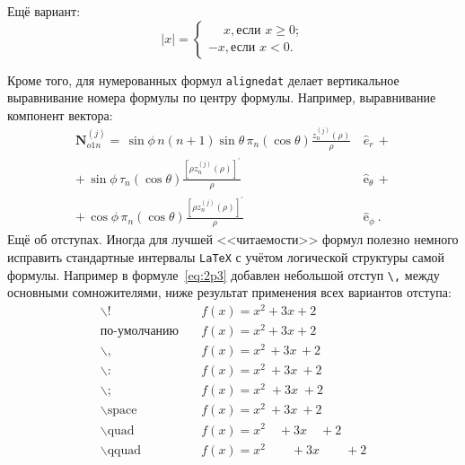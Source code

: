 \documentclass[12pt]{extarticle}
\begin{document}
Ещё вариант:
\[|x|=
    \begin{cases}
        \phantom{-}x, \text{если } x \geqslant 0; \\
        -x, \text{если } x<0.
    \end{cases}\]

Кроме того, для нумерованных формул \texttt{alignedat} делает вертикальное
выравнивание номера формулы по центру формулы.
Например, выравнивание компонент вектора:
\begin{equation}
\label{eq:2p3}
    \begin{alignedat}{2}
        {\mathbf{N}}_{o1n}^{(j)} = \,{\sin} \phi\,n\!\left(n+1\right)
        {\sin}\theta\,
        \pi_n\!\left({\cos} \theta\right)
        \frac{
        z_n^{(j)}\!\left( \rho \right)
        }{\rho}\,
         & {\hat{ e}}_{r}\,+      \\
        +\,
        {\sin} \phi\,
        \tau_n\!\left({\cos} \theta\right)
        \frac{
        \left[\rho z_n^{(j)}\!\left( \rho \right)\right]^{\prime}
        }{\rho}\,
         & {\hat{\mathrm e}}_{\theta}\,+ \\
        +\,
        {\cos} \phi\,
        \pi_n\!\left({\cos} \theta\right)
        \frac{
        \left[\rho z_n^{(j)}\!\left( \rho \right)\right]^{\prime}
        }{\rho}\,
         & {\hat{\mathrm e}}_{\phi}\:.
    \end{alignedat}
\end{equation}
Ещё об отступах.
Иногда для лучшей {}<<читаемости>>{} формул полезно немного исправить стандартные интервалы \texttt{LaTeX} с учётом логической структуры самой формулы.
Например в формуле~\eqref{eq:2p3} добавлен небольшой отступ \texttt{\textbackslash{},} между основными сомножителями, ниже результат применения всех вариантов отступа:
\[\begin{aligned}
    \backslash!             & \quad f(x) = x^2\! +3x\! +2         \\
    \mbox{по-умолчанию}     & \quad f(x) = x^2+3x+2               \\
    \backslash,             & \quad f(x) = x^2\, +3x\, +2         \\
    \backslash{:}           & \quad f(x) = x^2\: +3x\: +2         \\
    \backslash;             & \quad f(x) = x^2\; +3x\; +2         \\
    \backslash \mbox{space} & \quad f(x) = x^2\ +3x\ +2           \\
    \backslash \mbox{quad}  & \quad f(x) = x^2\quad +3x\quad +2   \\
    \backslash \mbox{qquad} & \quad f(x) = x^2\qquad +3x\qquad +2
\end{aligned}\]
\end{document}
